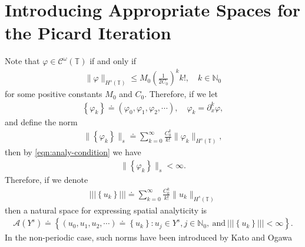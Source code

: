 \documentclass[12pt,reqno]{amsart}
\numberwithin{equation}{section}  %
\numberwithin{figure}{section}
\newcommand{\ci}{\mathbb{T}}
\newcommand{\p}{\partial}
\newcommand{\vp}{\varphi}
\theoremstyle{plain}
\theoremstyle{definition}
\theoremstyle{remark}
\begin{document}
\section{Introducing Appropriate Spaces for the Picard Iteration}
\label{sec:picard-spaces}
Note that $\vp \in
\mathcal{C}^{\omega}(\ci)$ if and only if
%
%
\begin{equation}
\begin{split}
  \|\vp \|_{H^s(\ci)} \le M_{0} \left( \frac{1}{2 C_0} \right)^{k} k!, \quad k
  \in \mathbb{N}_0
  \label{eqn:analy-condition}
\end{split}
\end{equation}
%
%
for some positive constants $M_0$ and $C_0$. Therefore, if we let
%
%
\begin{equation*}
\begin{split}
  \left\{ \vp_k \right\} \doteq \left( \vp_{0}, \vp_{1}, \vp_{2}, \cdots
  \right), \quad \vp_k = \p_x^k \vp,
\end{split}
\end{equation*}
%
%
and define the norm
%
%
\begin{equation*}
\begin{split}
  \|\left\{ \vp_k \right\} \|_{s} \doteq \sum_{k=0}^\infty \frac{C_0^k}{k!}
  \|\vp_k \|_{H^s(\ci)},
\end{split}
\end{equation*}
%
%
then by \eqref{eqn:analy-condition} we have
%
%
\begin{equation*}
\begin{split}
  \|\left\{ \vp_k \right\} \|_s < \infty.
\end{split}
\end{equation*}
%
%
Therefore, if we denote 
%
%
\begin{equation*}
\begin{split}
  | | |\left\{ u_k \right\} | | | \doteq \sum_{k=0}^\infty \frac{C_0^k}{k!}
  \|u_k \|_{H^s(\ci)}
\end{split}
\end{equation*}
%
%
then a natural space for expressing spatial analyticity is
%
%
\begin{equation*}
\begin{split}
  \mathcal{A}(Y^s) \doteq \left\{ (u_0, u_1, u_2, \cdots ) \doteq \left\{ u_k
  \right\}: u_j \in Y^s, j \in \mathbb{N}_0, \ \text{and}\ | | |\left\{ u_k
  \right\} | | | < \infty \right\}.
\end{split}
\end{equation*}
%
%
In the non-periodic case, such norms have been introduced by Kato and Ogawa
\end{document}

